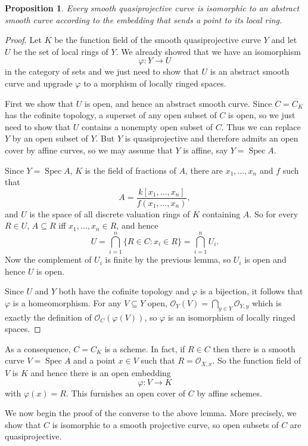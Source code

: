 \documentclass[reqno,12pt,letterpaper]{amsart}
\DeclareMathOperator{\Spec}{Spec}
\newcommand{\Olo}{\mathscr O}
\newtheorem{proposition}[theorem]{Proposition}
\theoremstyle{definition}
\begin{document}
\begin{proposition}
Every smooth quasiprojective curve is isomorphic to an abstract smooth curve according to the embedding that sends a point to its local ring.
\end{proposition}
\begin{proof}
Let $K$ be the function field of the smooth quasiprojective curve $Y$ and let $U$ be the set of local rings of $Y$.
We already showed that we have an isomorphism
$$\varphi: Y \to U$$
in the category of sets and we just need to show that $U$ is an abstract smooth curve and upgrade $\varphi$ to a morphism of locally ringed spaces.

First we show that $U$ is open, and hence an abstract smooth curve.
Since $C = C_K$ has the cofinite topology, a superset of any open subset of $C$ is open, so we just need to show that $U$ contains a nonempty open subset of $C$.
Thus we can replace $Y$ by an open subset of $Y$.
But $Y$ is quasiprojective and therefore admits an open cover by affine curves, so we may assume that $Y$ is affine, say $Y = \Spec A$.

Since $Y = \Spec A$, $K$ is the field of fractions of $A$, there are $x_1, \dots, x_n$ and $f$ such that
$$A = \frac{k[x_1, \dots, x_n]}{f(x_1, \dots, x_n)},$$
and $U$ is the space of all discrete valuation rings of $K$ containing $A$.
So for every $R \in U$, $A \subseteq R$ iff $x_1, \dots, x_n \in R$, and hence
$$U = \bigcap_{i=1}^n \{R \in C: x_i \in R\} = \bigcap_{i=1}^n U_i.$$
Now the complement of $U_i$ is finite by the previous lemma, so $U_i$ is open and hence $U$ is open.

Since $U$ and $Y$ both have the cofinite topology and $\varphi$ is a bijection, it follows that $\varphi$ is a homeomorphism.
For any $V \subseteq Y$ open, $\Olo_Y(V) = \bigcap_{y \in Y} \Olo_{Y,y}$ which is exactly the definition of $\Olo_C(\varphi(V))$, so $\varphi$ is an isomorphism of locally ringed spaces.
\end{proof}

As a consequence, $C = C_K$ is a scheme.
In fact, if $R \in C$ then there is a smooth curve $V = \Spec A$ and a point $x \in V$ such that $R = \Olo_{X,x}$.
So the function field of $V$ is $K$ and hence there is an open embedding
$$\varphi: V \to K$$
with $\varphi(x) = R$. This furnishes an open cover of $C$ by affine schemes.

We now begin the proof of the converse to the above lemma.
More precisely, we show that $C$ is isomorphic to a smooth projective curve, so open subsets of $C$ are quasiprojective.
\end{document}
